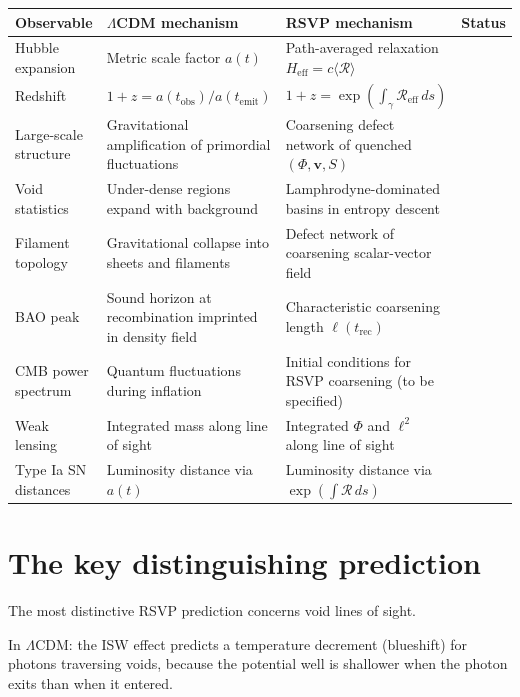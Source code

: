 \begin{center}
\small
\begin{tabular}{@{}p{2.5cm}p{3.5cm}p{3.5cm}p{2.5cm}@{}}
\toprule
\textbf{Observable}
& \textbf{$\Lambda$CDM mechanism}
& \textbf{RSVP mechanism}
& \textbf{Status} \\
\midrule
Hubble expansion
& Metric scale factor $a(t)$
& Path-averaged relaxation $H_{\mathrm{eff}} = c\langle\mathcal{R}\rangle$
& \statusconjectured{} \\
\addlinespace
Redshift
& $1+z = a(t_{\mathrm{obs}})/a(t_{\mathrm{emit}})$
& $1+z = \exp(\int_\gamma\mathcal{R}_{\mathrm{eff}}\,ds)$
& \statusconjectured{} \\
\addlinespace
Large-scale structure
& Gravitational amplification of primordial fluctuations
& Coarsening defect network of quenched $(\Phi,\mathbf{v},S)$
& \statusconjectured{} \\
\addlinespace
Void statistics
& Under-dense regions expand with background
& Lamphrodyne-dominated basins in entropy descent
& \statusconjectured{} \\
\addlinespace
Filament topology
& Gravitational collapse into sheets and filaments
& Defect network of coarsening scalar-vector field
& \statusconjectured{} \\
\addlinespace
BAO peak
& Sound horizon at recombination imprinted in density field
& Characteristic coarsening length $\ell(t_{\mathrm{rec}})$
& \statusopen{} \\
\addlinespace
CMB power spectrum
& Quantum fluctuations during inflation
& Initial conditions for RSVP coarsening (to be specified)
& \statusopen{} \\
\addlinespace
Weak lensing
& Integrated mass along line of sight
& Integrated $\Phi$ and $\ell^2$ along line of sight
& \statusopen{} \\
\addlinespace
Type Ia SN distances
& Luminosity distance via $a(t)$
& Luminosity distance via $\exp(\int\mathcal{R}\,ds)$
& \statusconjectured{} \\
\bottomrule
\end{tabular}
\end{center}

\section{The key distinguishing prediction}

The most distinctive RSVP prediction concerns void lines of sight.

In $\Lambda$CDM: the ISW effect predicts a temperature decrement
(blueshift) for photons traversing voids, because the potential
well is shallower when the photon exits than when it entered.

